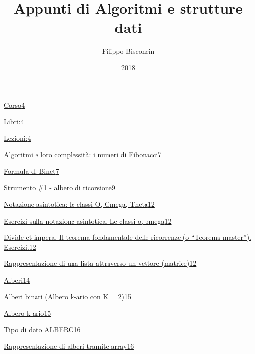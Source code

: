 \documentclass{article}
\title{Appunti di Algoritmi e strutture dati}
\author{Filippo Bisconcin}
\date{2018}
\begin{document}
\begin{titlepage}
\maketitle
\end{titlepage}

{\protect\hyperlink{h.h3wcjgbw0vzs}{Corso}}{\protect\hyperlink{h.h3wcjgbw0vzs}{4}}

{\protect\hyperlink{h.h56evxq8lcvu}{Libri:}}{\protect\hyperlink{h.h56evxq8lcvu}{4}}

{\protect\hyperlink{h.56skrlxpqr7c}{Lezioni:}}{\protect\hyperlink{h.56skrlxpqr7c}{4}}

{\protect\hyperlink{h.erye91slvrba}{Algoritmi e loro complessità: i numeri di Fibonacci}}{\protect\hyperlink{h.erye91slvrba}{7}}

{\protect\hyperlink{h.uo8t8gg7vdaw}{Formula di Binet}}{\protect\hyperlink{h.uo8t8gg7vdaw}{7}}

{\protect\hyperlink{h.x4ciu865ga1f}{Strumento \#1 - albero di ricorsione}}{\protect\hyperlink{h.x4ciu865ga1f}{9}}

{\protect\hyperlink{h.jkxlloc1lefg}{Notazione asintotica: le classi O, Omega, Theta}}{\protect\hyperlink{h.jkxlloc1lefg}{12}}

{\protect\hyperlink{h.tn5j57miv2l8}{Esercizi sulla notazione asintotica. Le classi o, omega}}{\protect\hyperlink{h.tn5j57miv2l8}{12}}

{\protect\hyperlink{h.qp9ilz1tito1}{Divide et impera. Il teorema fondamentale delle ricorrenze (o ``Teorema master''). Esercizi.}}{\protect\hyperlink{h.qp9ilz1tito1}{12}}

{\protect\hyperlink{h.a5tr7osf4zwh}{Rappresentazione di una lista attraverso un vettore (matrice)}}{\protect\hyperlink{h.a5tr7osf4zwh}{12}}

{\protect\hyperlink{h.rgokfftftjlb}{Alberi}}{\protect\hyperlink{h.rgokfftftjlb}{14}}

{\protect\hyperlink{h.rmzlh8kpnju}{Alberi binari (Albero k-ario con K = 2)}}{\protect\hyperlink{h.rmzlh8kpnju}{15}}

{\protect\hyperlink{h.chua2o837in5}{Albero k-ario}}{\protect\hyperlink{h.chua2o837in5}{15}}

{\protect\hyperlink{h.8kg49eb4dpz1}{Tipo di dato ALBERO}}{\protect\hyperlink{h.8kg49eb4dpz1}{16}}

{\protect\hyperlink{h.ueuovjwdu9zj}{Rappresentazione di alberi tramite array}}{\protect\hyperlink{h.ueuovjwdu9zj}{16}}
\end{document}
